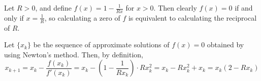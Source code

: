 \documentclass{homework}
\begin{document}
\maketitle

\question Let $R > 0$, and define $f(x) = 1 - \frac{1}{Rx}$ for $x > 0$. Then clearly $f(x) = 0$ if and only if $x = \frac{1}{R}$, so calculating a zero of $f$ is equivalent to calculating the reciprocal of $R$.

Let $\{x_k\}$ be the sequence of approximate solutions of $f(x) = 0$ obtained by using Newton's method. Then, by definition,
\begin{equation}
	x_{k+1} = x_k - \frac{f(x_k)}{f'(x_k)} = x_k - \left(1-\frac{1}{Rx_k}\right)\cdot Rx_k^2 = x_k - Rx_k^2 + x_k = x_k(2-Rx_k)
\end{equation}

\question 
\end{document}
